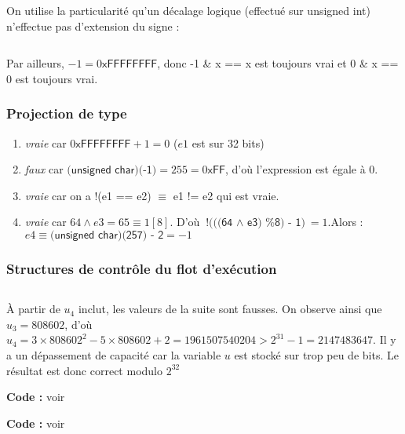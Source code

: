 \documentclass[../main.tex]{subfiles}
\begin{document}
On utilise la particularité qu'un décalage logique (effectué sur \textsf{unsigned int}) n'effectue pas d'extension du signe :
\inputminted{c}{solutions/part2/chapter2/valeur_absolue.c}
Par ailleurs, $-1 = 0\textsf{xFFFFFFFF}$, donc \textsf{-1 \& x == x} est toujours vrai et \textsf{0 \& x == 0} est toujours vrai.
\subsubsection{Projection de type}
\begin{enumerate}
	\item \textit{vraie} car $0\textsf{xFFFFFFFF} + 1 = 0$ ($e1$ est sur 32 bits)
	\item \textit{faux} car $\textsf{(unsigned char)(-1)} = 255 = 0\textsf{xFF}$, d'où l'expression est égale à 0.
	\item \textit{vraie} car on a \textsf{!(e1 == e2)} $\equiv$ \textsf{e1 != e2} qui est vraie.
	\item \textit{vraie} car $64\wedge{e3} = 65 \equiv 1[8]$. D'où $\textsf{!(((64 $\wedge$ e3) \% 8) - 1)} = 1$.\newline Alors : $e4 \equiv{\textsf{(unsigned char)(257) - 2}} = -1$
\end{enumerate}
\subsubsection{Structures de contrôle du flot d'exécution}
\solution{}
\inputminted{c}{solutions/part2/chapter2/cours_structure_controle.c}
À partir de $u_{4}$ inclut, les valeurs de la suite sont fausses. On observe ainsi que $u_{3} = 808602$, d'où $u_{4} = 3\times808602^{2} - 5\times{808602} + 2 = 1961507540204 > 2^{31} - 1 = 2147483647$. Il y a un dépassement de capacité car la variable $u$ est stocké sur trop peu de bits. Le résultat est donc correct modulo $2^{32}$
 

\textbf{Code :} voir 


\textbf{Code :} voir 
\end{document}
